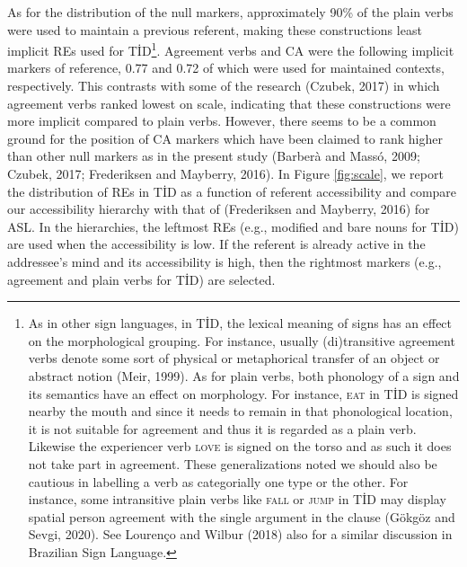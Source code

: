 \documentclass[]{elsarticle} %
\begin{document}
As for the distribution of the null markers, approximately 90\% of the
plain verbs were used to maintain a previous referent, making these
constructions least implicit REs used for TİD\footnote{As in other sign
  languages, in TİD, the lexical meaning of signs has an effect on the
  morphological grouping. For instance, usually (di)transitive agreement
  verbs denote some sort of physical or metaphorical transfer of an
  object or abstract notion (Meir, 1999). As for plain verbs, both
  phonology of a sign and its semantics have an effect on morphology.
  For instance, \textsc{eat} in TİD is signed nearby the mouth and since
  it needs to remain in that phonological location, it is not suitable
  for agreement and thus it is regarded as a plain verb. Likewise the
  experiencer verb \textsc{love} is signed on the torso and as such it
  does not take part in agreement. These generalizations noted we should
  also be cautious in labelling a verb as categorially one type or the
  other. For instance, some intransitive plain verbs like \textsc{fall}
  or \textsc{jump} in TİD may display spatial person agreement with the
  single argument in the clause (Gökgöz and Sevgi, 2020). See Lourenço
  and Wilbur (2018) also for a similar discussion in Brazilian Sign
  Language.}. Agreement verbs and CA were the following implicit markers
of reference, 0.77 and 0.72 of which were used for maintained contexts,
respectively. This contrasts with some of the research (Czubek, 2017) in
which agreement verbs ranked lowest on scale, indicating that these
constructions were more implicit compared to plain verbs. However, there
seems to be a common ground for the position of CA markers which have
been claimed to rank higher than other null markers as in the present
study (Barberà and Massó, 2009; Czubek, 2017; Frederiksen and Mayberry,
2016). In Figure \ref{fig:scale}, we report the distribution of REs in
TİD as a function of referent accessibility and compare our
accessibility hierarchy with that of (Frederiksen and Mayberry, 2016)
for ASL. In the hierarchies, the leftmost REs (e.g., modified and bare
nouns for TİD) are used when the accessibility is low. If the referent
is already active in the addressee's mind and its accessibility is high,
then the rightmost markers (e.g., agreement and plain verbs for TİD) are
selected.
\end{document}
